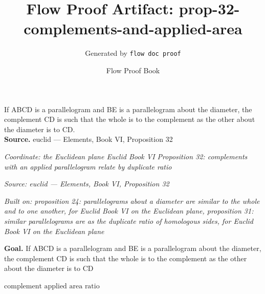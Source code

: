 \documentclass[11pt]{article}
\title{Flow Proof Artifact: prop-32-complements-and-applied-area}
\author{Generated by \texttt{flow doc proof}}
\date{Flow Proof Book}
\theoremstyle{definition}
\begin{document}
\maketitle
If ABCD is a parallelogram and BE is a parallelogram about the diameter, the complement CD is such that the whole is to the complement as the other about the diameter is to CD.\\[0.5em]
\textbf{Source.} euclid — Elements, Book VI, Proposition 32\\[0.5em]
\bigskip
{}\par
\smallskip\noindent\textit{Coordinate: the Euclidean plane \cdot Euclid Book VI \cdot Proposition 32: complements with an applied parallelogram relate by duplicate ratio}\par
\smallskip\noindent\textit{Source: euclid — Elements, Book VI, Proposition 32}\par
\smallskip\noindent\textit{Built on: proposition 24: parallelograms about a diameter are similar to the whole and to one another, for Euclid Book VI on the Euclidean plane, proposition 31: similar parallelograms are as the duplicate ratio of homologous sides, for Euclid Book VI on the Euclidean plane}\par
\medskip
\noindent\textbf{Goal.} If ABCD is a parallelogram and BE is a parallelogram about the diameter, the complement CD is such that the whole is to the complement as the other about the diameter is to CD\par
\noindent$\displaystyle \text{complement applied area ratio}$\par
\medskip
\noindent
\end{document}
